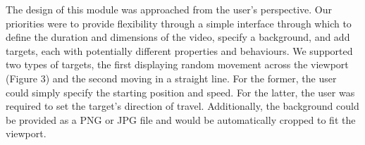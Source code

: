 \documentclass[a4paper,11pt]{article}
\begin{document}
The design of this module was approached from the user's perspective. Our priorities were to provide flexibility through a simple interface through which to define the duration and dimensions of the video, specify a background, and add targets, each with potentially different properties and behaviours. We supported two types of targets, the first displaying random movement across the viewport (Figure 3) and the second moving in a straight line. For the former, the user could simply specify the starting position and speed. For the latter, the user was required to set the target's direction of travel. Additionally, the background could be provided as a PNG or JPG file and would be automatically cropped to fit the viewport.

\begin{figure}[H]
\centering
\begin{minipage}{0.2\textwidth}
\end{minipage}
\begin{minipage}{0.2\textwidth}

\end{minipage}
\end{figure}
\end{document}
